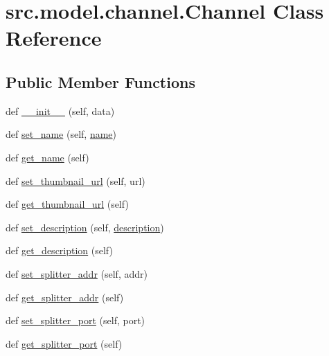 \hypertarget{classsrc_1_1model_1_1channel_1_1Channel}{}\section{src.\+model.\+channel.\+Channel Class Reference}
\label{classsrc_1_1model_1_1channel_1_1Channel}
\subsection*{Public Member Functions}
\begin{DoxyCompactItemize}
\item 
def \hyperlink{classsrc_1_1model_1_1channel_1_1Channel_afdb66a9fc77fdc223a2f846af2620031}{\+\_\+\+\_\+init\+\_\+\+\_\+} (self, data)
\item 
def \hyperlink{classsrc_1_1model_1_1channel_1_1Channel_a23bb3d03a5d535656b1d7da1443fefb2}{set\+\_\+name} (self, \hyperlink{classsrc_1_1model_1_1channel_1_1Channel_a8dbe9977c4645a971e904ee3a835591a}{name})
\item 
def \hyperlink{classsrc_1_1model_1_1channel_1_1Channel_a69755052301f482710968b7e75bcc717}{get\+\_\+name} (self)
\item 
def \hyperlink{classsrc_1_1model_1_1channel_1_1Channel_a1c881f114626eca37f3490a5495e8946}{set\+\_\+thumbnail\+\_\+url} (self, url)
\item 
def \hyperlink{classsrc_1_1model_1_1channel_1_1Channel_ace3189099288f408d7453c5a256b302c}{get\+\_\+thumbnail\+\_\+url} (self)
\item 
def \hyperlink{classsrc_1_1model_1_1channel_1_1Channel_adf3e8289bd4ed56a14c66e4fd5027826}{set\+\_\+description} (self, \hyperlink{classsrc_1_1model_1_1channel_1_1Channel_a770009a6989a62ae3166a7ade0b21f27}{description})
\item 
def \hyperlink{classsrc_1_1model_1_1channel_1_1Channel_a87edf0f1ebcb5358cfb2c665ffa3cae4}{get\+\_\+description} (self)
\item 
def \hyperlink{classsrc_1_1model_1_1channel_1_1Channel_a3b9d71c044f74bfee4191419f3338593}{set\+\_\+splitter\+\_\+addr} (self, addr)
\item 
def \hyperlink{classsrc_1_1model_1_1channel_1_1Channel_a00c45545ba60b117783d12f56fb25142}{get\+\_\+splitter\+\_\+addr} (self)
\item 
def \hyperlink{classsrc_1_1model_1_1channel_1_1Channel_a05f446cec125be2025fe4324fab52250}{set\+\_\+splitter\+\_\+port} (self, port)
\item 
def \hyperlink{classsrc_1_1model_1_1channel_1_1Channel_a5c59edff7944c11a011a60198355db2d}{get\+\_\+splitter\+\_\+port} (self)
\end{DoxyCompactItemize}
